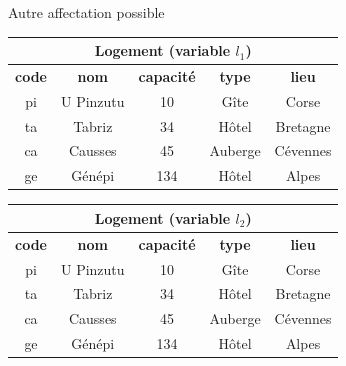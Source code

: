 \begin{frame}[fragile]{Autre affectation possible}

\begin{tabular}{c|c|c|c|c}
\multicolumn{5}{c}{\textbf{Logement (variable $l_1$)}}\\ \hline
\textbf{code} & \textbf{nom} & \textbf{capacité} & \textbf{type} & \textbf{lieu}\\ \hline 
pi & U Pinzutu & 10 & Gîte & Corse\\ \hline 
ta & Tabriz & 34 & Hôtel & Bretagne\\ \hline 
ca & Causses & 45 & Auberge & Cévennes\\ \hline 
\rowcolor{asparagus}
ge & Génépi & 134 & Hôtel & Alpes\\ \hline 
\end{tabular}

\vfill

\begin{tabular}{c|c|c|c|c}
\multicolumn{5}{c}{\textbf{Logement (variable $l_2$)}}\\ \hline
\textbf{code} & \textbf{nom} & \textbf{capacité} & \textbf{type} & \textbf{lieu}\\ \hline 
pi & U Pinzutu & 10 & Gîte & Corse\\ \hline 
\rowcolor{bananamania}
ta & Tabriz & 34 & Hôtel & Bretagne\\ \hline 
ca & Causses & 45 & Auberge & Cévennes\\ \hline 
ge & Génépi & 134 & Hôtel & Alpes\\ \hline 
\end{tabular}

\end{frame}

